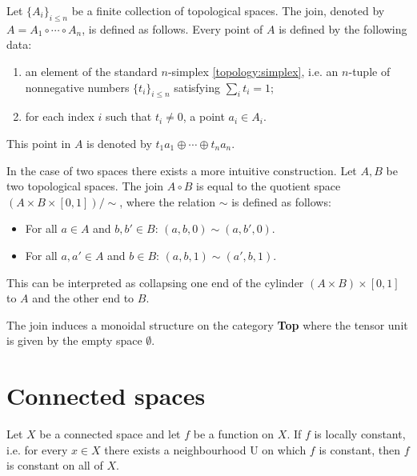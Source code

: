     \begin{construct}[Join]\label{topology:join}
        Let $\{A_i\}_{i\leq n}$ be a finite collection of topological spaces. The join, denoted by $A=A_1\circ\cdots\circ A_n$, is defined as follows. Every point of $A$ is defined by the following data:
        \begin{enumerate}
            \item an element of the standard $n$-simplex \ref{topology:simplex}, i.e. an $n$-tuple of nonnegative numbers $\{t_i\}_{i\leq n}$ satisfying $\sum_it_i=1$;
            \item for each index $i$ such that $t_i\neq 0$, a point $a_i\in A_i$.
        \end{enumerate}
        This point in $A$ is denoted by $t_1a_1\oplus\cdots\oplus t_na_n$.

        In the case of two spaces there exists a more intuitive construction. Let $A,B$ be two topological spaces. The join $A\circ B$ is equal to the quotient space $(A\times B\times[0,1])/\sim$, where the relation $\sim$ is defined as follows:
        \begin{itemize}
            \item For all $a\in A$ and $b,b'\in B$: $(a,b,0)\sim(a,b',0)$.
            \item For all $a,a'\in A$ and $b\in B$: $(a,b,1)\sim(a',b,1)$.
        \end{itemize}
        This can be interpreted as collapsing one end of the cylinder $(A\times B)\times[0,1]$ to $A$ and the other end to $B$.
    \end{construct}
    \begin{property}
        The join induces a monoidal structure on the category \textbf{Top} where the tensor unit is given by the empty space $\emptyset$.
    \end{property}

\section{Connected spaces}


    \begin{property}
        Let $X$ be a connected space and let $f$ be a function on $X$. If $f$ is locally constant, i.e. for every $x\in X$ there exists a neighbourhood U on which $f$ is constant, then $f$ is constant on all of $X$.
    \end{property}

